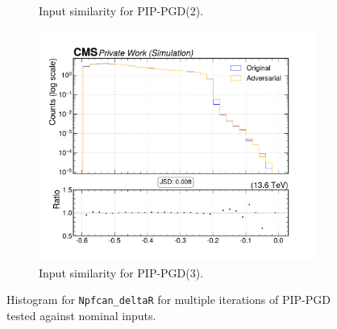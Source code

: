 \begin{figure}[htbp]
\begin{subfigure}[t]{0.32\textwidth}
    \caption*{Input similarity for PIP-PGD(2).}
  \end{subfigure}\hfill
  \begin{subfigure}[t]{0.32\textwidth}
    \includegraphics[width=\linewidth]{media/output/features/compare/combined_it_3/cmp_npf_arr_Npfcan_deltaR.pdf}
    \caption*{Input similarity for PIP-PGD(3).}
  \end{subfigure}

  \caption*{Histogram for \texttt{Npfcan\_deltaR} for multiple iterations of PIP-PGD tested against nominal inputs.}
  \label{fig:combined_input_Npfcan_deltaR}
\end{figure}

